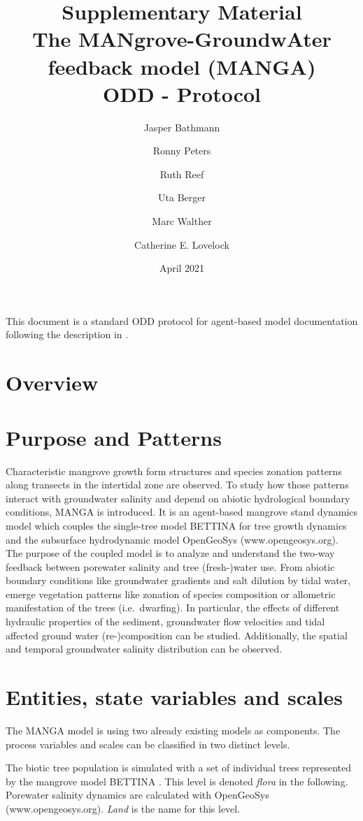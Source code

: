 \documentclass[manusscript, 12p, authoryear]{elsarticle}
\title{Supplementary Material\\The MANgrove-GroundwAter feedback model (MANGA) \\ ODD - Protocol}
\author[1,2]{Jasper Bathmann\corref{cor1}%
}
\author[3]{Ronny Peters}
\author[4]{Ruth Reef}
\author[3]{Uta Berger}
\author[1,2]{Marc Walther}
\author[5]{Catherine E. Lovelock}
\date{April 2021}                                           %
\begin{document}
\maketitle 
This document is a standard ODD protocol for agent-based model documentation following the description in \citet{Grimm2020}.
\tableofcontents
\section*{Overview}
\section{Purpose and Patterns}
Characteristic mangrove growth form structures and species zonation patterns along transects in the intertidal zone are observed.
To study how those patterns interact with groundwater salinity and depend on abiotic hydrological boundary conditions, MANGA is introduced.
It is an agent-based mangrove stand dynamics model which couples the single-tree model BETTINA \citep{Ronny2014} for tree growth dynamics and the subsurface hydrodynamic model OpenGeoSys (www.opengeosys.org).
The purpose of the coupled model is to analyze and understand the two-way feedback between porewater salinity and tree (fresh-)water use.
From abiotic boundary conditions like groundwater gradients and salt dilution by tidal water, emerge vegetation patterns like zonation of species composition or allometric manifestation of the trees (i.e.~dwarfing).
In particular, the effects of different hydraulic properties of the sediment, groundwater flow velocities and tidal affected ground water (re-)composition can be studied.
Additionally, the spatial and temporal groundwater salinity distribution can be observed.



\section{Entities, state variables and scales}
The MANGA model is using two already existing models as components.
The process variables and scales can be classified in two distinct levels.

The biotic tree population is simulated with a set of individual trees represented by the mangrove model BETTINA \citep{Ronny2014}.
This level is denoted \textit{flora} in the following.
Porewater salinity dynamics are calculated with OpenGeoSys (www.opengeosys.org).
\textit{Land} is the name for this level.
\end{document}
